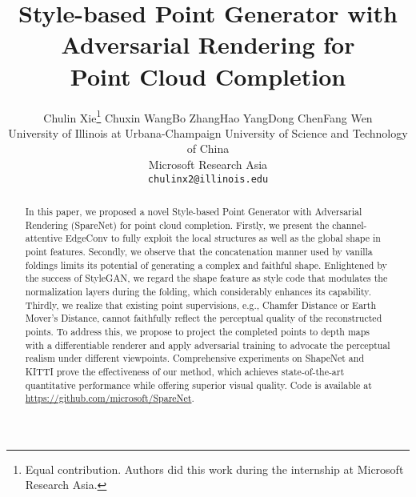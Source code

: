 \documentclass[final]{cvpr}
\newcommand*\samethanks[1][\value{footnote}]{\footnotemark[#1]}
\begin{document}
\title{Style-based Point Generator with Adversarial Rendering for \\Point Cloud Completion}

\author{Chulin Xie\thanks{Equal contribution. Authors did this work during the internship at Microsoft Research Asia.}  \qquad Chuxin Wang\samethanks \qquad Bo Zhang\qquad Hao Yang\qquad Dong Chen\qquad Fang Wen \\ 
University of Illinois at Urbana-Champaign  \qquad University of Science and Technology of China \qquad \\ Microsoft Research Asia\\
{\tt\small chulinx2@illinois.edu}    
}

\maketitle

\begin{abstract}





In this paper, we proposed a novel Style-based Point Generator with Adversarial Rendering (SpareNet) for point cloud completion. 
Firstly, we present the channel-attentive EdgeConv to fully exploit the local structures as well as the global shape in point features. 
Secondly, we observe that the concatenation manner used by vanilla foldings limits its potential of generating a complex and faithful shape. Enlightened by the success of StyleGAN, we regard the shape feature as style code that modulates the normalization layers during the folding, which considerably enhances its capability. 
Thirdly, we realize that existing point supervisions, e.g., Chamfer Distance or Earth Mover's Distance, cannot faithfully reflect the perceptual quality of the reconstructed points. To address this, we propose to project the completed points to depth maps with a differentiable renderer and apply adversarial training to advocate the perceptual realism under different viewpoints. Comprehensive experiments on ShapeNet and KITTI prove the effectiveness of our method, which achieves state-of-the-art quantitative performance while offering superior visual quality. Code is available at \href{https://github.com/microsoft/SpareNet}{https://github.com/microsoft/SpareNet}.  

\end{abstract}
\end{document}

